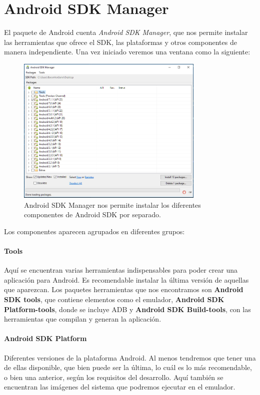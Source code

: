 \section{Android SDK Manager}\label{sec:SDKManager}

El paquete de Android  cuenta \emph{Android SDK Manager}, que nos permite instalar las herramientas que ofrece el SDK, las plataformas y  otros componentes de manera independiente. Una vez iniciado veremos una ventana como la siguiente:

\begin{figure}[H]
\centering
  \includegraphics[width=0.8\textwidth]{Figures/anexo/android_tools/sdk_manager}
  \caption{Android SDK Manager nos permite instalar los diferentes componentes de Android SDK por separado.}
\end{figure}

Los componentes aparecen agrupados en diferentes grupos:

\paragraph{Tools} Aquí se encuentran varias herramientas indispensables para poder crear una aplicación para Android. Es recomendable instalar la última versión de aquellas que aparezcan. Los paquetes herramientas que nos encontramos son \textbf{Android SDK tools}, que contiene elementos como el emulador, \textbf{Android SDK Platform-tools}, donde se incluye \gls{ADB} y \textbf{Android SDK Build-tools}, con las herramientas que compilan y generan la aplicación.

\paragraph{Android SDK Platform} Diferentes versiones de la plataforma Android. Al menos tendremos que tener una de ellas disponible, que bien puede ser la última, lo cuál es lo más recomendable, o bien una anterior, según los requisitos del desarrollo. Aquí también se encuentran las imágenes del sistema que podremos ejecutar en el emulador.

